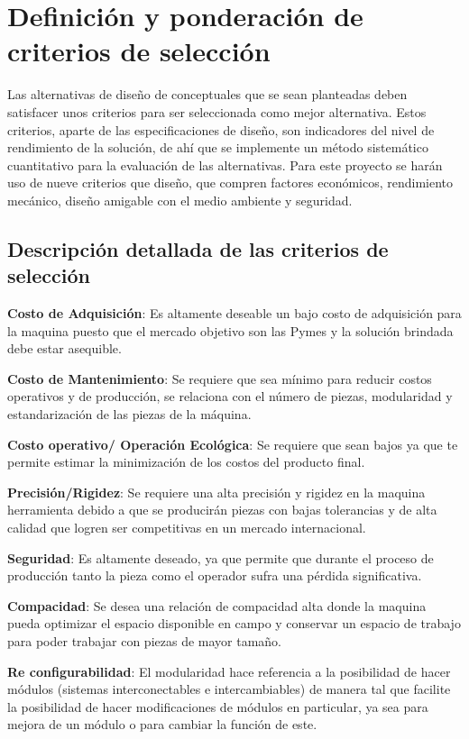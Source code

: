 \newpage

\section{Definición y ponderación de criterios de selección}
Las alternativas de diseño de conceptuales que se sean planteadas deben satisfacer unos criterios para ser seleccionada como mejor alternativa. Estos criterios, aparte de las especificaciones de diseño, son indicadores del nivel de rendimiento de la solución, de ahí que se implemente un método sistemático cuantitativo para la evaluación de las alternativas. Para este proyecto se harán uso de nueve criterios que diseño, que compren factores económicos, rendimiento mecánico, diseño amigable con el medio ambiente y seguridad.

\subsection{Descripción detallada de las criterios de selección}
\textbf{Costo de Adquisición}: Es altamente deseable un bajo costo de adquisición para la maquina puesto que el mercado objetivo son las Pymes y la solución brindada debe estar asequible.

\textbf{Costo de Mantenimiento}: Se requiere que sea mínimo para reducir costos operativos y de producción, se relaciona con el número de piezas, modularidad y estandarización de las piezas de la máquina.

\textbf{Costo operativo/ Operación Ecológica}: Se requiere que sean bajos ya que te permite estimar la minimización de los costos del producto final.

\textbf{Precisión/Rigidez}: Se requiere una alta precisión y rigidez en la maquina herramienta debido a que se producirán piezas con bajas tolerancias y de alta calidad que logren ser competitivas en un mercado internacional.

\textbf{Seguridad}: Es altamente deseado, ya que permite que durante el proceso de producción tanto la pieza como el operador sufra una pérdida significativa.

\textbf{Compacidad}: Se desea una relación de compacidad alta donde la maquina pueda optimizar el espacio disponible en campo y conservar un espacio de trabajo para poder trabajar con piezas de mayor tamaño.

\textbf{Re configurabilidad}: El modularidad hace referencia a la posibilidad de hacer módulos (sistemas interconectables e intercambiables) de manera tal que facilite la posibilidad de hacer modificaciones de módulos en particular, ya sea para mejora de un módulo o para cambiar la función de este.

